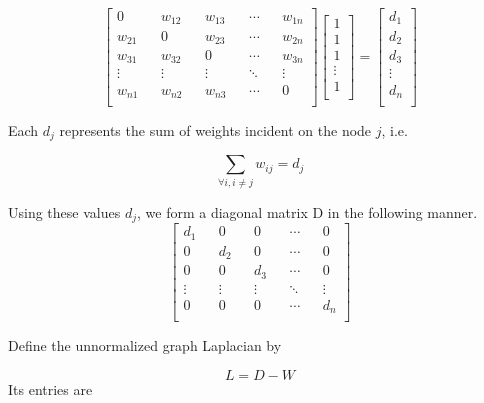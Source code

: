 \documentclass[english]{article}
\theoremstyle{plain}
\begin{document}
\begin{equation}
\begin{bmatrix}
0 && w_{12} && w_{13} && \cdots && w_{1n} \\
w_{21} && 0 && w_{23} && \cdots && w_{2n} \\
w_{31} && w_{32} && 0 && \cdots && w_{3n} \\
\vdots && \vdots && \vdots && \ddots && \vdots \\
w_{n1} && w_{n2} && w_{n3} && \cdots && 0 \\
\end{bmatrix}
\begin{bmatrix}
1 \\
1 \\
1 \\
\vdots \\
1 \\
\end{bmatrix}
= 
\begin{bmatrix}
d_{1} \\
d_{2} \\
d_{3} \\
\vdots \\
d_{n} \\
\end{bmatrix}
\end{equation}

Each $d_{j}$ represents the sum of weights incident on the node $j$, i.e.

\begin{equation}
\sum_{\forall i, i\neq j} w_{ij} = d_{j}
\end{equation}

Using these values $d_{j}$, we form a diagonal matrix D in the following manner.
\begin{equation}
\begin{bmatrix}
d_{1} && 0 && 0 && \cdots && 0 \\
0 && d_{2} && 0 && \cdots && 0 \\
0 && 0 && d_{3} && \cdots && 0 \\
\vdots && \vdots && \vdots && \ddots && \vdots\\
0 && 0 && 0 && \cdots && d_{n} \\
\end{bmatrix}
\end{equation}

Define the unnormalized graph Laplacian by

\begin{equation}
L = D - W
\end{equation}
Its entries are
\end{document}
